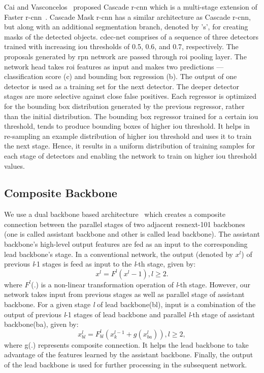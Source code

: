 \documentclass[a4paper,conference]{IEEEtran}
\begin{document}
Cai and Vasconcelos~\cite{cai2019cascade} proposed Cascade {\sc r-cnn} which is a multi-stage extension of Faster {\sc r-cnn}~\cite{ren2015faster}. Cascade Mask {\sc r-cnn} has a similar architecture as Cascade {\sc r-cnn}, but along with an additional segmentation branch, denoted by '{\sc s}', for creating masks of the detected objects. {\sc cd}e{\sc c-n}et comprises of a sequence of three detectors trained with increasing {\sc i}o{\sc u} thresholds of 0.5, 0.6, and 0.7, respectively. The proposals generated by {\sc rpn} network are passed through {\sc roi} pooling layer. The network head takes {\sc roi} features as input and makes two predictions --- classification score ({\sc c}) and bounding box regression ({\sc b}). The output of one detector is used as a training set for the next detector. The deeper detector stages are more selective against close false positives. Each regressor is optimized for the bounding box distribution generated by the previous regressor, rather than the initial distribution. The bounding box regressor trained for a certain {\sc i}o{\sc u} threshold, tends to produce bounding boxes of higher {\sc i}o{\sc u} threshold. It helps in re-sampling an example distribution of higher {\sc i}o{\sc u} threshold and uses it to train the next stage. Hence, it results in a uniform distribution of training samples for each stage of detectors and enabling the network to train on higher {\sc i}o{\sc u} threshold values. 

\subsection{Composite Backbone}

We use a dual backbone based architecture~\cite{liu2019cbnet} which creates a composite connection between the parallel stages of two adjacent {\sc r}es{\sc n}e{\sc x}t-101 backbones (one is called assistant backbone and other is called lead backbone). The assistant backbone's high-level output features are fed as an input to the corresponding lead backbone's stage.
In a conventional network, the output (denoted by $x^l$) of previous \emph{l}-1 stages  is feed as input to the \emph{l}-th stage, given by:
\begin{equation}
    x^l=F^l(x^{l} - 1) , l\geq 2.
\end{equation}
where $F^l$(.) is a non-linear transformation operation of \emph{l}-th stage.
However, our network takes input from previous stages as well as parallel stage of assistant backbone. For a given stage \emph{l} of lead backbone(bl), input is a combination of the output of previous \emph{l}-1 stages of lead backbone and parallel \emph{l}-th stage of assistant backbone(ba), given by:
\begin{equation}
    x^{l}_{bl} = F^{l}_{bl}(x^{l-1}_{k}  + g(x^{l}_{ba})), l\geq2,
\end{equation}
where g(.) represents composite connection. It helps the lead backbone to take advantage of the features learned by the assistant backbone. Finally, the output of the lead backbone is used for further processing in the subsequent network. 
\end{document}
